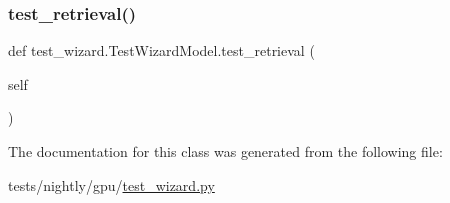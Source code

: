 \subsubsection{\texorpdfstring{test\+\_\+retrieval()}{test\_retrieval()}}
{\footnotesize\ttfamily def test\+\_\+wizard.\+Test\+Wizard\+Model.\+test\+\_\+retrieval (\begin{DoxyParamCaption}\item[{}]{self }\end{DoxyParamCaption})}



The documentation for this class was generated from the following file\+:\begin{DoxyCompactItemize}
\item 
tests/nightly/gpu/\hyperlink{test__wizard_8py}{test\+\_\+wizard.\+py}\end{DoxyCompactItemize}
